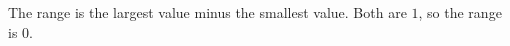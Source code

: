 The range is the largest value minus the smallest value. Both are $1$, so the range is $\boxed{0}$.
